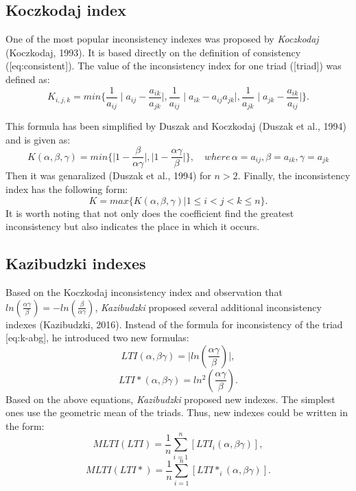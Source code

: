 \subsection{Koczkodaj index}

One of the most popular inconsistency indexes was proposed by \textit{Koczkodaj} (Koczkodaj, 1993). It is based directly on the definition of consistency ([eq:consistent]). The value of the inconsistency index for one triad ([triad]) was defined as:
	\begin{equation} 
		K_{i,j,k}=min\{\frac{1}{a_{ij}}\mid a_{ij}-\frac{a_{ik}}{a_{jk}}\mid,\frac{1}{a_{ij}}\mid a_{ik}-a_{ij}a_{jk}\mid,\frac{1}{a_{jk}}\mid a_{jk}-\frac{a_{ik}}{a_{ij}}\mid\}.
	 \end{equation}

 This formula has been simplified by Duszak and Koczkodaj (Duszak et al., 1994) and is given as:
 	\begin{equation} 
		K(\alpha,\beta,\gamma)=min\{\mid1-\frac{\beta}{\alpha\gamma}\mid,\mid1-\frac{\alpha\gamma}{\beta}\mid\},\,\,\,\,\,\,where\,\alpha=a_{ij},\beta=a_{ik},\gamma=a_{jk}
	 \end{equation}
 Then it was genaralized (Duszak et al., 1994) for $n>2$. Finally, the inconsistency index has the following form:
 	\begin{equation} 
		K=max\{K(\alpha,\beta,\gamma)|1\leq i<j<k\leq n\}.
	 \end{equation}
 It is worth noting that not only does the coefficient find the greatest inconsistency but also indicates the place in which it occurs.


\subsection{Kazibudzki indexes}

Based on the Koczkodaj inconsistency index and observation that $ln(\frac{\alpha\gamma}{\beta})=-ln(\frac{\beta}{\alpha\gamma})$, \textit{Kazibudzki} proposed several additional inconsistency indexes (Kazibudzki, 2016). Instead of the formula for inconsistency of the triad [eq:k-abg], he introduced two new formulas:
	\begin{equation} 
		LTI(\alpha,\beta\gamma)=\mid ln(\frac{\alpha\gamma}{\beta})\mid,
	 \end{equation}
	\begin{equation} 
		LTI*(\alpha,\beta\gamma)=ln^{2}(\frac{\alpha\gamma}{\beta}).
	 \end{equation}
Based on the above equations, \textit{Kazibudzki} proposed new indexes. The simplest ones use the geometric mean of the triads. Thus, new indexes could be written in the form:
	\begin{equation} 
		MLTI(LTI)=\frac{1}{n}\sum_{i=1}^{n}\left[LTI_{i}(\alpha,\beta\gamma)\right],
	 \end{equation}
 	\begin{equation} 
		MLTI(LTI*)=\frac{1}{n}\sum_{i=1}^{n}\left[LTI*_{i}(\alpha,\beta\gamma)\right].
			 \end{equation}
 

